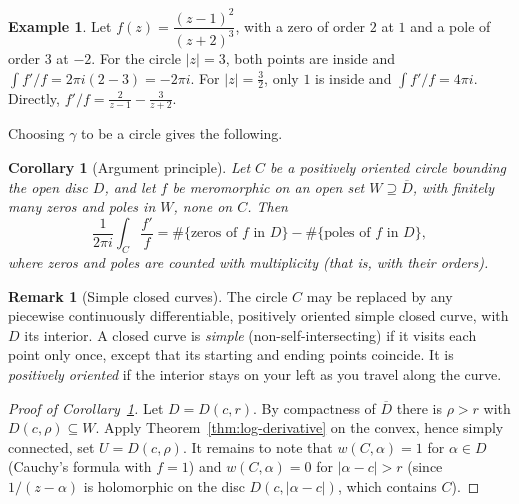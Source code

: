 \documentclass[11pt]{article}
\theoremstyle{plain}
\newtheorem{corollary}[theorem]{Corollary}
\theoremstyle{definition}
\newtheorem{example}[theorem]{Example}
\theoremstyle{boldremark}
\newtheorem*{remark}{Remark}
\theoremstyle{remark}
\numberwithin{equation}{section}
\newenvironment{lecturefigure}
 {\par\addvspace{0.25em}\begingroup\setlength{\parskip}{0pt}\centering}
 {\par\endgroup\addvspace{0.25em}}
\begin{document}
\begin{example}
Let $f(z)=\dfrac{(z-1)^2}{(z+2)^3}$, with a zero of order $2$ at $1$ and a
pole of order $3$ at $-2$. For the circle $|z|=3$, both points are inside
and $\int f'/f=2\pi i(2-3)=-2\pi i$. For $|z|=\tfrac32$, only $1$ is inside
and $\int f'/f=4\pi i$. Directly,
$f'/f=\frac{2}{z-1}-\frac{3}{z+2}$.
\end{example}

Choosing $\gamma$ to be a circle gives the following.

\begin{corollary}[Argument principle]\label{cor:argument}
Let $C$ be a positively oriented circle bounding the open disc $D$, and
let $f$ be meromorphic on an open set $W\supseteq\overline D$, with finitely
many zeros and poles in $W$, none on $C$. Then
\[
 \boxed{\frac{1}{2\pi i}\int_C\frac{f'}{f}
 =\#\{\text{zeros of $f$ in $D$}\}-\#\{\text{poles of $f$ in $D$}\},}
\]
where zeros and poles are counted with multiplicity (that is, with their
orders).
\end{corollary}

\begin{remark}[Simple closed curves]
The circle $C$ may be replaced by any piecewise continuously differentiable,
positively oriented simple closed curve, with $D$ its interior. A closed
curve is \emph{simple} (non-self-intersecting) if it visits each point only once, except that its
starting and ending points coincide. It is \emph{positively oriented} if
the interior stays on your left as you travel along the curve.
\end{remark}

\begin{proof}[Proof of Corollary~\ref{cor:argument}]
Let $D=D(c,r)$. By compactness of $\overline D$ there is $\rho>r$ with
$D(c,\rho)\subseteq W$. Apply Theorem~\ref{thm:log-derivative} on the
convex, hence simply connected, set $U=D(c,\rho)$. It remains to note that
$w(C,\alpha)=1$ for $\alpha\in D$ (Cauchy's formula with $f=1$) and
$w(C,\alpha)=0$ for $|\alpha-c|>r$ (since $1/(z-\alpha)$ is holomorphic on
the disc $D(c,|\alpha-c|)$, which contains $C$).
\end{proof}

\begin{lecturefigure}
\end{lecturefigure}
\end{document}
